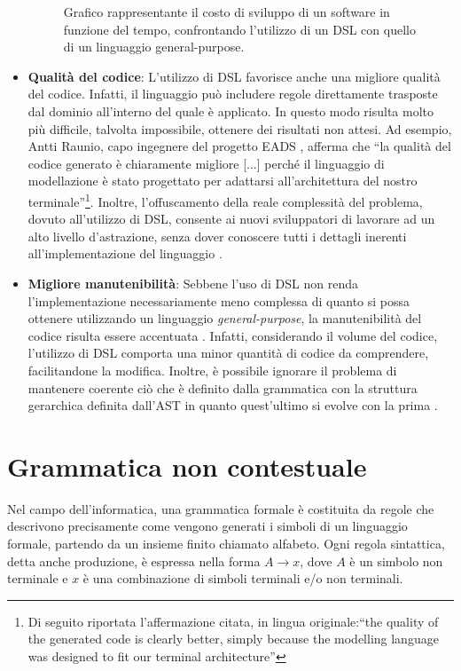 \documentclass[12pt,a4paper,openright,twoside]{book}
\begin{document}
\begin{itemize}
\begin{figure}
        \caption{Grafico rappresentante il costo di sviluppo di un software in funzione del tempo, confrontando l'utilizzo di un DSL con 
        quello di un linguaggio general-purpose.}
        \label{fig:sw-dev-cost}
    \end{figure}
    \item \textbf{Qualità del codice}: L'utilizzo di \ac{DSL} favorisce anche una migliore qualità del codice. Infatti, il linguaggio può 
    includere regole direttamente trasposte dal dominio all'interno del quale è applicato. In questo modo risulta molto più difficile, talvolta 
    impossibile, ottenere dei risultati non attesi. Ad esempio, Antti Raunio, capo ingegnere del progetto EADS \cite{EADS}, afferma che ``la 
    qualità del codice generato è chiaramente migliore [...] perché il linguaggio di modellazione è stato progettato per adattarsi 
    all'architettura del nostro terminale''\footnote{Di seguito riportata l'affermazione citata, in lingua originale:``the quality of the 
    generated code is clearly better, simply because the modelling language was designed to fit our terminal architecture''}. Inoltre, 
    l'offuscamento della reale complessità del problema, dovuto all'utilizzo di \ac{DSL}, consente ai nuovi sviluppatori di lavorare ad un 
    alto livello d'astrazione, senza dover conoscere tutti i dettagli inerenti all'implementazione del linguaggio \cite{EADS}. 
    \item \textbf{Migliore manutenibilità}: Sebbene l'uso di \ac{DSL} non renda l'implementazione necessariamente meno complessa di quanto 
    si possa ottenere utilizzando un linguaggio \textit{general-purpose}, la manutenibilità del codice risulta essere accentuata 
    \cite{Klint2010}.  Infatti, considerando il volume del codice, l'utilizzo di \ac{DSL} comporta una minor quantità di codice da comprendere, 
    facilitandone la modifica. Inoltre, è possibile  ignorare il problema di mantenere coerente ciò che è definito dalla grammatica con la 
    struttura gerarchica definita dall'\ac{AST} in quanto quest'ultimo si evolve con la prima \cite{Brabrand2010}.
\end{itemize}

\section{Grammatica non contestuale}
Nel campo dell’informatica, una grammatica formale è costituita da regole che descrivono precisamente come vengono generati i simboli di un 
linguaggio formale, partendo da un insieme finito chiamato alfabeto. Ogni regola sintattica, detta anche produzione, è espressa nella forma 
$A \rightarrow x$, dove $A$ è un simbolo non terminale e $x$ è una combinazione di simboli terminali e/o non terminali.
\end{document}
